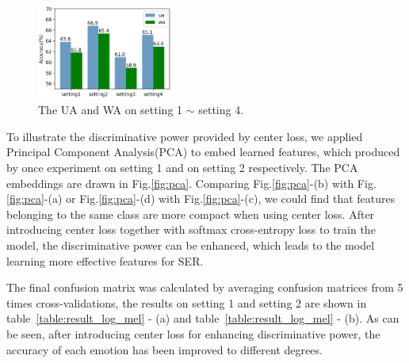 \documentclass{article}
\begin{document}
\begin{figure}[htb]
	\begin{minipage}[b]{1.0\linewidth}
		\centerline{\includegraphics[width=4.5cm]{fig6}}
	\end{minipage}
	\caption{The UA and WA on setting 1 $\sim$ setting 4.}
	\label{fig:setting1-4}
\end{figure}

To illustrate the discriminative power provided by center loss, we applied Principal Component Analysis({PCA}) to embed learned features, which produced by once experiment on setting 1 and on setting 2 respectively. The PCA embeddings are drawn in Fig.\ref{fig:pca}. Comparing Fig.\ref{fig:pca}-(b) with Fig.\ref{fig:pca}-(a) or Fig.\ref{fig:pca}-(d) with Fig.\ref{fig:pca}-(c), we could find that features belonging to the same class are more compact when using center loss. After introducing center loss together with softmax cross-entropy loss to train the model, the discriminative power can be enhanced, which leads to the model learning more effective features for SER.

The final confusion matrix was calculated by averaging confusion matrices from 5 times cross-validations, the results on setting 1 and setting 2 are shown in table~\ref{table:result_log_mel} - (a) and table~\ref{table:result_log_mel} - (b). As can be seen, after introducing center loss for enhancing discriminative power, the accuracy of each emotion has been improved to different degrees.
\end{document}
